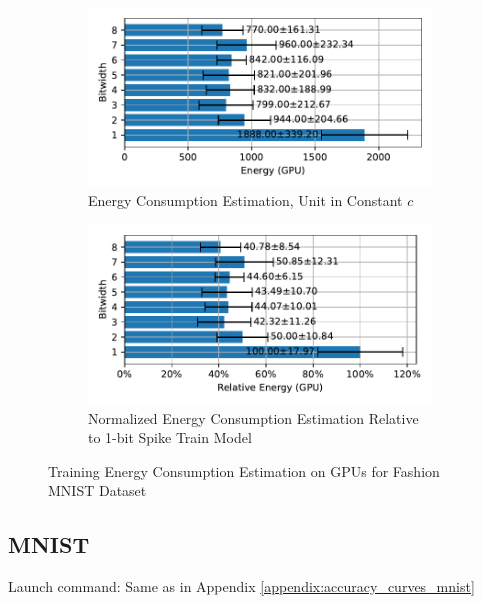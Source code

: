         \begin{figure}[H]
            \centering
            \begin{subfigure}[H]{0.6\textwidth}
                \includegraphics[width=\textwidth]{../standard/FashionMNIST/plots/fashionmnist_train_energy_gpu_horizontal.pdf}
                \caption{Energy Consumption Estimation, Unit in Constant $c$}
            \end{subfigure}
            \hfill
            \begin{subfigure}[H]{0.6\textwidth}
                \includegraphics[width=\textwidth]{../standard/FashionMNIST/plots/fashionmnist_train_relative_energy_gpu_horizontal.pdf}
                \caption{Normalized Energy Consumption Estimation Relative to 1-bit Spike Train Model}
            \end{subfigure}
            \caption{Training Energy Consumption Estimation on GPUs for Fashion MNIST Dataset}
        \end{figure}

    \subsection{MNIST}
    \label{appendix:energy_gpu_mnist}
        Launch command: Same as in Appendix \ref{appendix:accuracy_curves_mnist}


